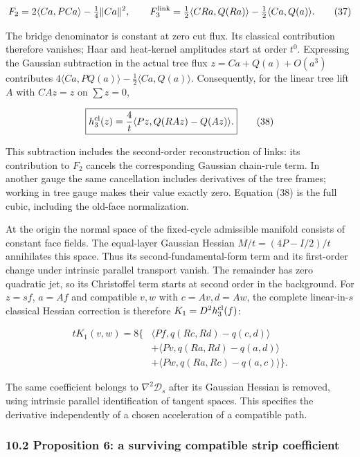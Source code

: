 \documentclass[11pt,a4paper]{article}
\begin{document}
\[F_2=2\langle Ca,PCa\rangle-\tfrac14\|Ca\|^2,\qquad
F_3^{\rm link}=\tfrac12\langle CRa,Q(Ra)\rangle
-\tfrac12\langle Ca,Q(a)\rangle.\tag{37}\]

The bridge denominator is constant at zero cut flux. Its classical
contribution therefore vanishes; Haar and heat-kernel amplitudes start
at order \(t^0\). Expressing the Gaussian subtraction in the actual tree
flux \(z=Ca+Q(a)+O(a^3)\) contributes
\(4\langle Ca,PQ(a)\rangle-\tfrac12\langle Ca,Q(a)\rangle\).
Consequently, for the linear tree lift \(A\) with \(CAz=z\) on
\(\sum z=0\),

\[\boxed{h^{\rm cl}_3(z)=\frac4t
\langle Pz,Q(RAz)-Q(Az)\rangle.}\tag{38}\]

This subtraction includes the second-order reconstruction of links: its
contribution to \(F_2\) cancels the corresponding Gaussian chain-rule
term. In another gauge the same cancellation includes derivatives of the
tree frames; working in tree gauge makes their value exactly zero.
Equation (38) is the full cubic, including the old-face normalization.

At the origin the normal space of the fixed-cycle admissible manifold
consists of constant face fields. The equal-layer Gaussian Hessian
\(M/t=(4P-I/2)/t\) annihilates this space. Thus its
second-fundamental-form term and its first-order change under intrinsic
parallel transport vanish. The remainder has zero quadratic jet, so its
Christoffel term starts at second order in the background. For \(z=sf\),
\(a=Af\) and compatible \(v,w\) with \(c=Av,d=Aw\), the complete
linear-in-\(s\) classical Hessian correction is therefore
\(K_1=D^2h^{\rm cl}_3(f)\):

\[\begin{aligned}
tK_1(v,w)=8\{&\langle Pf,q(Rc,Rd)-q(c,d)\rangle\\
&+\langle Pv,q(Ra,Rd)-q(a,d)\rangle\\
&+\langle Pw,q(Ra,Rc)-q(a,c)\rangle\}.
\end{aligned}\tag{39}\]

The same coefficient belongs to \(\nabla^2\mathcal D_s\) after its
Gaussian Hessian is removed, using intrinsic parallel identification of
tangent spaces. This specifies the derivative independently of a chosen
acceleration of a compatible path.

\hypertarget{proposition-6-a-surviving-compatible-strip-coefficient}{%
\subsubsection{10.2 Proposition 6: a surviving compatible strip
coefficient}\label{proposition-6-a-surviving-compatible-strip-coefficient}}
\end{document}
